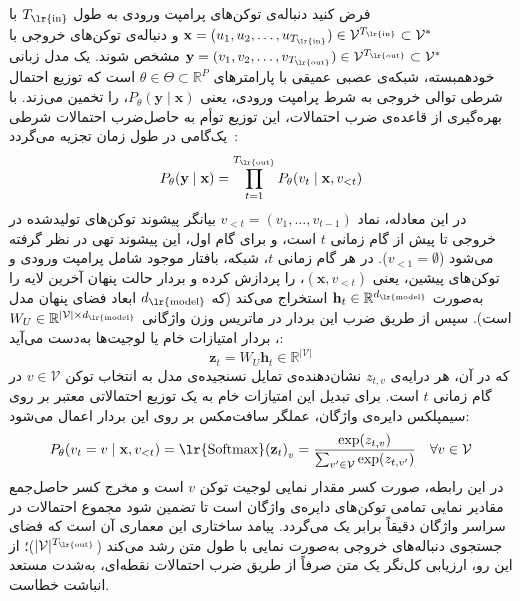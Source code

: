 فرض کنید دنباله‌ی توکن‌های پرامپت ورودی به طول $T_{\text{\lr{in}}}$ با $\mathbf{x} = (u_1, u_2, \dots, u_{T_{\text{\lr{in}}}}) \in \mathcal{V}^{T_{\text{\lr{in}}}} \subset \mathcal{V}^*$ و دنباله‌ی توکن‌های خروجی با $\mathbf{y} = (v_1, v_2, \dots, v_{T_{\text{\lr{out}}}}) \in \mathcal{V}^{T_{\text{\lr{out}}}} \subset \mathcal{V}^*$ مشخص شوند. یک مدل زبانی خودهمبسته، شبکه‌ی عصبی عمیقی با پارامترهای $\theta \in \Theta \subset \mathbb{R}^P$ است که توزیع احتمال شرطی توالی خروجی به شرط پرامپت ورودی، یعنی $P_\theta(\mathbf{y} \mid \mathbf{x})$، را تخمین می‌زند. با بهره‌گیری از قاعده‌ی ضرب احتمالات، این توزیع توأم به حاصل‌ضرب احتمالات شرطی یک‌گامی در طول زمان تجزیه می‌گردد~\cite{vaswani2017attention, brown2020language}:
\begin{equation}\label{eq:chap2_autoregressive}
    P_\theta(\mathbf{y} \mid \mathbf{x}) = \prod_{t=1}^{T_{\text{\lr{out}}}} P_\theta(v_t \mid \mathbf{x}, v_{<t})
\end{equation}
در این معادله، نماد $v_{<t} = (v_1, \dots, v_{t-1})$ بیانگر پیشوند توکن‌های تولیدشده در خروجی تا پیش از گام زمانی $t$ است، و برای گام اول، این پیشوند تهی در نظر گرفته می‌شود ($v_{<1} = \emptyset$). در هر گام زمانی $t$، شبکه، بافتار موجود شامل پرامپت ورودی و توکن‌های پیشین، یعنی $(\mathbf{x}, v_{<t})$، را پردازش کرده و بردار حالت پنهان آخرین لایه را به‌صورت $\mathbf{h}_t \in \mathbb{R}^{d_{\text{\lr{model}}}}$ استخراج می‌کند (که $d_{\text{\lr{model}}}$ ابعاد فضای پنهان مدل است). سپس از طریق ضرب این بردار در ماتریس وزن واژگانی $W_U \in \mathbb{R}^{|\mathcal{V}| \times d_{\text{\lr{model}}}}$، بردار امتیازات خام یا لوجیت‌ها به‌دست می‌آید:
\begin{equation}\label{eq:chap2_logits_generation}
    \mathbf{z}_t = W_U \mathbf{h}_t \in \mathbb{R}^{|\mathcal{V}|}
\end{equation}
که در آن، هر درایه‌ی $z_{t, v}$ نشان‌دهنده‌ی تمایل نسنجیده‌ی مدل به انتخاب توکن $v \in \mathcal{V}$ در گام زمانی $t$ است. برای تبدیل این امتیازات خام به یک توزیع احتمالاتی معتبر بر روی سیمپلکس دایره‌ی واژگان، عملگر سافت‌مکس بر روی این بردار اعمال می‌شود:
\begin{equation}\label{eq:chap2_softmax}
    P_\theta(v_t = v \mid \mathbf{x}, v_{<t}) = \text{\lr{Softmax}}{(\mathbf{z}_t)}_v = \frac{\exp(z_{t, v})}{\sum_{v' \in \mathcal{V}} \exp(z_{t, v'})} \quad \forall v \in \mathcal{V}
\end{equation}
در این رابطه، صورت کسر مقدار نمایی لوجیت توکن $v$ است و مخرج کسر حاصل‌جمع مقادیر نمایی تمامی توکن‌های دایره‌ی واژگان است تا تضمین شود مجموع احتمالات در سراسر واژگان دقیقاً برابر یک می‌گردد. پیامد ساختاری این معماری آن است که فضای جستجوی دنباله‌های خروجی به‌صورت نمایی با طول متن رشد می‌کند ($|\mathcal{V}|^{T_{\text{\lr{out}}}}$)؛ از این رو، ارزیابی کل‌نگر یک متن صرفاً از طریق ضرب احتمالات نقطه‌ای، به‌شدت مستعد انباشت خطاست.

